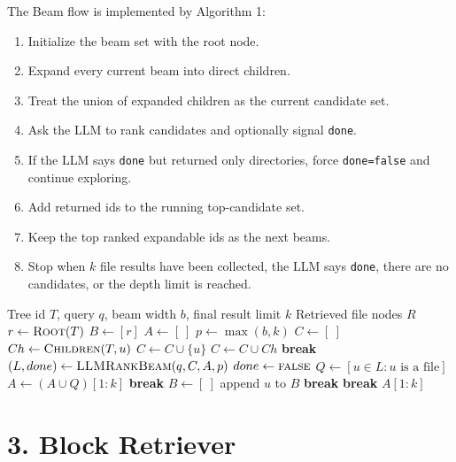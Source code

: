 \documentclass{article}
\begin{document}
The Beam flow is implemented by Algorithm 1:
\begin{enumerate}
  \item Initialize the beam set with the root node.
  \item Expand every current beam into direct children.
  \item Treat the union of expanded children as the current candidate set.
  \item Ask the LLM to rank candidates and optionally signal \texttt{done}.
  \item If the LLM says \texttt{done} but returned only directories, force
  \texttt{done=false} and continue exploring.
  \item Add returned ids to the running top-candidate set.
  \item Keep the top ranked expandable ids as the next beams.
  \item Stop when $k$ file results have been collected, the LLM says
  \texttt{done}, there are no candidates, or the depth limit is reached.
\end{enumerate}

\begin{algorithm}[H]
\caption{FilesystemBeam}
\begin{algorithmic}[1]
\Require Tree id $T$, query $q$, beam width $b$, final result limit $k$
\Ensure Retrieved file nodes $R$
\State $r \gets \Call{Root}{T}$
\State $B \gets [r]$
\State $A \gets [\ ]$
\State $p \gets \max(b,k)$
  \State $C \gets [\ ]$
    \State $Ch \gets \Call{Children}{T,u}$
      \State $C \gets C \cup \{u\}$
    \Else
      \State $C \gets C \cup Ch$
    \EndIf
  \EndFor
    \State \textbf{break}
  \EndIf
  \State $(L, done) \gets \Call{LLMRankBeam}{q, C, A, p}$
    \State $done \gets \textsc{false}$
  \EndIf
  \State $Q \gets [u \in L: u \text{ is a file}]$
  \State $A \gets (A \cup Q)[1:k]$
    \State \textbf{break}
  \EndIf
  \State $B \gets [\ ]$
      \State append $u$ to $B$
    \EndIf
      \State \textbf{break}
    \EndIf
  \EndFor
    \State \textbf{break}
  \EndIf
\EndFor
\State \Return $A[1:k]$
\end{algorithmic}
\end{algorithm}

\section*{3. Block Retriever}
\end{document}

